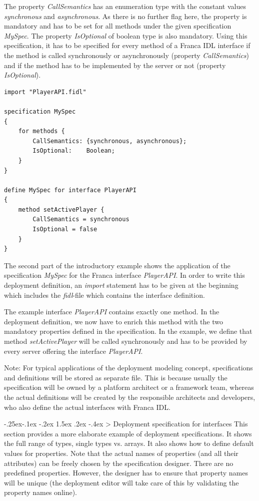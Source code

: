 \documentclass[a4paper,10pt]{scrreprt}
\makeatletter
\renewcommand\subsection{\medskip\@startsection{subsection}{2}{\z@}%
  {-.25ex\@plus -.1ex \@minus -.2ex}%
  {1.5ex \@plus .2ex \@minus -.4ex}%
  {\ifnum \scr@compatibility>\@nameuse{scr@v@2.96}\relax
    \setlength{\parfillskip}{\z@ plus 1fil}\fi
    \raggedsection\normalfont\sectfont\nobreak\size@subsection
  }%
}
\makeatother
\begin{document}
The property \textit{CallSemantics} has an enumeration type with the constant values
\textit{synchronous} and \textit{asynchronous}. As there is no further flag here, the property
is mandatory and has to be set for all methods under the given specification \textit{MySpec}.
The property \textit{IsOptional} of boolean type is also mandatory. Using this specification,
it has to be specified for every method of a Franca IDL interface if the method is
called synchronously or asynchronously (property \textit{CallSemantics}) 
and if the method has to be implemented by the server or not (property \textit{IsOptional}). 


\begin{lstlisting}[language=FDeploy]
import "PlayerAPI.fidl"

specification MySpec
{
	for methods {
		CallSemantics: {synchronous, asynchronous};
		IsOptional:    Boolean;
	}
}

define MySpec for interface PlayerAPI
{
	method setActivePlayer {
		CallSemantics = synchronous
		IsOptional = false
	}
}
\end{lstlisting}

The second part of the introductory example shows the application of the
specification \textit{MySpec} for the Franca interface \textit{PlayerAPI}. In order to write
this deployment definition, an \textit{import} statement has to be given at the
beginning which includes the \textit{fidl}-file which contains the interface definition.

The example interface \textit{PlayerAPI} contains exactly one method. In the deployment
definition, we now have to enrich this method with the two mandatory properties defined
in the specification. In the example, we define that method \textit{setActivePlayer} will
be called synchronously and has to be provided by every server offering the
interface \textit{PlayerAPI}.

Note: For typical applications of the deployment modeling concept, specifications
and definitions will be stored as separate file. This is because usually the specification
will be owned by a platform architect or a framework team, whereas the actual definitions
will be created by the responsible architects and developers, who also define the
actual interfaces with Franca IDL. 

\subsection{Deployment specification for interfaces}
\label{DeploymentModels_Specifications_Interfaces}
This section provides a more elaborate example of deployment specifications.
It shows the full range of types, single types vs. arrays. It also shows how to
define default values for properties. Note that the actual names of properties 
(and all their attributes) can be freely chosen by the specification designer. 
There are no predefined properties. However, the designer has to ensure that 
property names will be unique (the deployment editor will take care of this
by validating the property names online).
\end{document}
